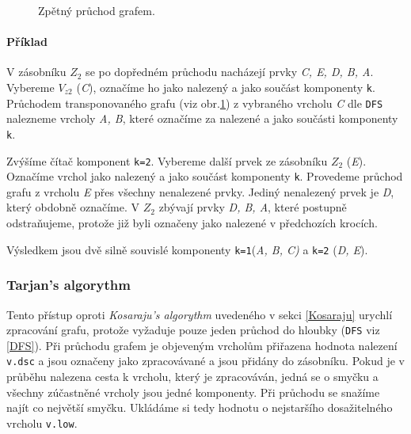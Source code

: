\documentclass[12pt]{article}
\begin{document}
\begin{figure}
\vspace{-1cm}
\caption{Zpětný průchod grafem.}
\label{backward_kosara}
\end{figure}


\paragraph{Příklad}
V zásobníku $Z_2$ se po dopředném průchodu nacházejí prvky \textit{C, E, D, B, A}. Vybereme $V_{z2}$ (\textit{C}), označíme ho jako nalezený a jako součást komponenty \texttt{k}. Průchodem transponovaného grafu (viz obr.\ref{backward_kosara}) z vybraného vrcholu \textit{C} dle \texttt{DFS} nalezneme vrcholy \textit{A, B}, které označíme za nalezené a jako součásti komponenty \texttt{k}.

Zvýšíme čítač komponent \texttt{k=2}. Vybereme další prvek ze zásobníku $Z_2$ (\textit{E}). Označíme vrchol jako nalezený a jako součást komponenty \texttt{k}. Provedeme průchod grafu z vrcholu \textit{E} přes všechny nenalezené prvky. Jediný nenalezený prvek je \textit{D}, který obdobně označíme. V $Z_2$ zbývají prvky \textit{D, B, A}, které postupně odstraňujeme, protože již byli označeny jako nalezené v předchozích krocích.

Výsledkem jsou dvě silně souvislé komponenty \texttt{k=1}(\textit{A, B, C)} a \texttt{k=2} (\textit{D, E}).

\subsubsection{Tarjan's algorythm\cite{Tarjan}}
\label{tarajan}
Tento přístup oproti \textit{Kosaraju's algorythm} uvedeného v sekci \ref{Kosaraju} urychlí zpracování grafu, protože vyžaduje pouze jeden průchod do hloubky (\texttt{DFS} viz \ref{DFS}). 
Při průchodu grafem je objeveným vrcholům přiřazena hodnota nalezení \texttt{v.dsc} a jsou označeny jako zpracovávané a jsou přidány do zásobníku. Pokud je v průběhu nalezena cesta k vrcholu, který je zpracováván, jedná se o smyčku a všechny zúčastněné vrcholy jsou jedné komponenty. Při průchodu se snažíme najít co největší smyčku. Ukládáme si tedy hodnotu o nejstaršího dosažitelného vrcholu \texttt{v.low}.
\end{document}
